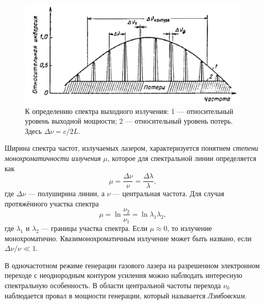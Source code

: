\documentclass[12pt, russian, a4paper]{article}
\begin{document}
	\begin{figure}[htbp]
		\centering
		\includegraphics[scale=0.8]{../images/freq-width.png}
		\caption{К определению спектра выходного излучения: 1 --- относительный уровень выходной мощности; 2 --- относительный уровень потерь. Здесь $\Delta\nu = c/2L$.}
		\label{fig:freq-width}
	\end{figure}

	Ширина спектра частот, излучаемых лазером, характеризуется понятием \emph{степени монохроматичности излучения} $\mu$, которое для спектральной линии определяется как 
	\begin{equation}
		\mu = \dfrac{\Delta\nu}{\nu} = \dfrac{\Delta\lambda}{\lambda},
	\end{equation}
	где $\Delta\nu$ --- полуширина линии, а $\nu$ --- центральная частота. Для случая протяжённого участка спектра 
	\begin{equation}
		\mu = \ln\dfrac{\nu_2}{\nu_1} = \ln{\lambda_1}{\lambda_2},
	\end{equation}
	где $\lambda_1$ и $\lambda_2$ --- границы участка спектра. Если $\mu\approx0$, то излучение монохроматично. Квазимонохроматичным излучение может быть названо, если ${\Delta\nu}/{\nu}\ll1$.


	В одночастотном режиме генерации газового лазера на разрешенном электронном переходе с неоднородным контуром усиления можно наблюдать интересную спектральную особенность. В области центральной частоты перехода $\nu_0$ наблюдается провал в мощности генерации, который называется \emph{Лэмбовским}. 
\end{document}
